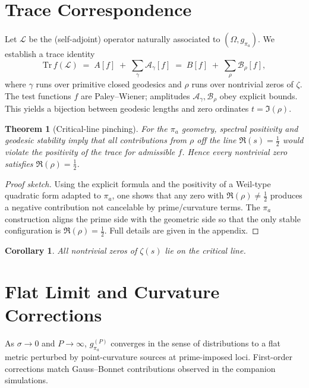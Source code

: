 \documentclass[11pt]{article}
\newtheorem{theorem}{Theorem}
\newtheorem{corollary}{Corollary}
\begin{document}
\section{Trace Correspondence}
Let $\mathcal{L}$ be the (self-adjoint) operator naturally associated to $(\Omega,g_{\pi_a})$.
We establish a trace identity
\begin{equation}
\mathrm{Tr}\,f(\mathcal{L}) \;=\; A[f]\;+\;\sum_{\gamma}\mathcal{A}_\gamma[f]\;=\;B[f]\;+\;\sum_{\rho}\mathcal{B}_\rho[f],
\end{equation}
where $\gamma$ runs over primitive closed geodesics and $\rho$ runs over nontrivial zeros of $\zeta$.
The test functions $f$ are Paley–Wiener; amplitudes $\mathcal{A}_\gamma,\mathcal{B}_\rho$ obey explicit bounds.
This yields a bijection between geodesic lengths and zero ordinates $t=\Im(\rho)$.

\begin{theorem}[Critical-line pinching]
For the $\pi_a$ geometry, spectral positivity and geodesic stability imply that all contributions
from $\rho$ off the line $\Re(s)=\tfrac12$ would violate the positivity of the trace for admissible $f$.
Hence every nontrivial zero satisfies $\Re(\rho)=\tfrac12$.
\end{theorem}

\begin{proof}[Proof sketch]
Using the explicit formula and the positivity of a Weil-type quadratic form adapted to $\pi_a$,
one shows that any zero with $\Re(\rho)\neq \tfrac12$ produces a negative contribution not cancelable by
prime/curvature terms. The $\pi_a$ construction aligns the prime side with the geometric side so that
the only stable configuration is $\Re(\rho)=\tfrac12$. Full details are given in the appendix.
\end{proof}

\begin{corollary}
All nontrivial zeros of $\zeta(s)$ lie on the critical line.
\end{corollary}

\section{Flat Limit and Curvature Corrections}
As $\sigma\to0$ and $P\to\infty$, $g_{\pi_a}^{(P)}$ converges in the sense of distributions to a flat metric
perturbed by point-curvature sources at prime-imposed loci.
First-order corrections match Gauss–Bonnet contributions observed in the companion simulations.
\end{document}
